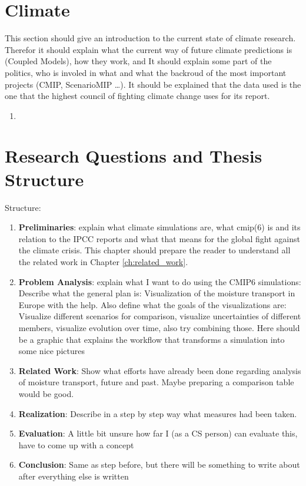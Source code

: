 \section{Climate}
\label{sec:climate}

This section should give an introduction to the current state of climate research. 
Therefor it should explain what the current way of future climate predictions is (Coupled Models), how they work, and 
It should explain some part of the politics, who is involed in what and what the backroud of the most important projects (CMIP, ScenarioMIP \dots). 
It should be explained that the data used is the one that the highest council of fighting climate change uses for its report. 

\begin{enumerate}
  \item
  
\end{enumerate}


\section{Research Questions and Thesis Structure}
\label{sec:research_questions}


Structure:

\begin{enumerate}
  \item \textbf{Preliminaries}: explain what climate simulations are, what cmip(6) is and its relation to the IPCC reports and what that means for the global fight against the climate crisis. 
    This chapter should prepare the reader to understand all the related work in Chapter \ref{ch:related_work}.
  \item \textbf{Problem Analysis}: explain what I want to do using the CMIP6 simulations: Describe what the general plan is: Visualization of the moisture transport in Europe with the help. 
    Also define what the goals of the visualizations are: Visualize different scenarios for comparison, visualize uncertainties of different members, visualize evolution over time, also try combining those. 
    Here should be a graphic that explains the workflow that transforms a simulation into some nice pictures
  \item \textbf{Related Work}: Show what efforts have already been done regarding analysis of moisture transport, future and past. 
    Maybe preparing a comparison table would be good. 
  \item \textbf{Realization}: Describe in a step by step way what measures had been taken. 
  \item \textbf{Evaluation}: A little bit unsure how far I (as a CS person) can evaluate this, have to come up with a concept
  \item \textbf{Conclusion}: Same as step before, but there will be something to write about after everything else is written
  
\end{enumerate}

